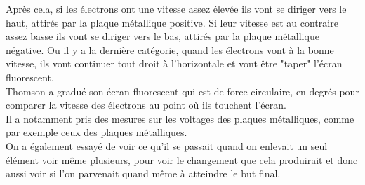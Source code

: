 \documentclass[../main.tex]{subfiles}
\begin{document}
Après cela, si les électrons ont une vitesse assez élevée ils vont se diriger vers le haut, attirés par la plaque métallique positive. Si leur vitesse est au contraire assez basse ils vont se diriger vers le bas, attirés par la plaque métallique négative. Ou il y a la dernière catégorie, quand les électrons vont à la bonne vitesse, ils vont continuer tout droit à l'horizontale et vont être "taper" l'écran fluorescent. \\
Thomson a gradué son écran fluorescent qui est de force circulaire, en degrés pour comparer la vitesse des électrons au point où ils touchent l'écran. \\
Il a notamment pris des mesures sur les voltages des plaques métalliques, comme par exemple ceux des plaques métalliques. \\
On a également essayé de voir ce qu'il se passait quand on enlevait un seul élément voir même plusieurs, pour voir le changement que cela produirait et donc aussi voir si l'on parvenait quand même à atteindre le but final.
\end{document}
